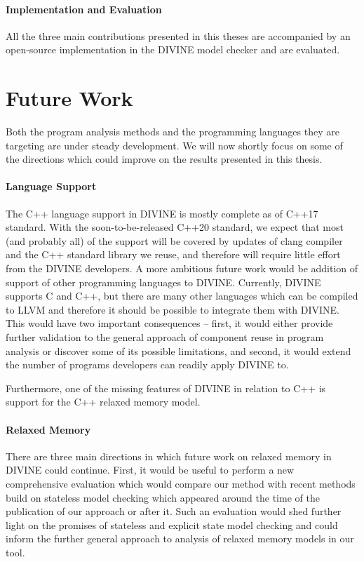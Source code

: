 \paragraph{Implementation and Evaluation}

All the three main contributions presented in this theses are accompanied by an open-source implementation in the DIVINE model checker and are evaluated.

\section{Future Work}

Both the program analysis methods and the programming languages they are targeting are under steady development.
We will now shortly focus on some of the directions which could improve on the results presented in this thesis.

\paragraph{Language Support}

The C++ language support in DIVINE is mostly complete as of C++17 standard.
With the soon-to-be-released C++20 standard, we expect that most (and probably all) of the support will be covered by updates of clang compiler and the C++ standard library we reuse, and therefore will require little effort from the DIVINE developers.
A more ambitious future work would be addition of support of other programming languages to DIVINE.
Currently, DIVINE supports C and C++, but there are many other languages which can be compiled to LLVM and therefore it should be possible to integrate them with DIVINE.
This would have two important consequences -- first, it would either provide further validation to the general approach of component reuse in program analysis or discover some of its possible limitations, and second, it would extend the number of programs developers can readily apply DIVINE to.

Furthermore, one of the missing features of DIVINE in relation to C++ is support for the C++ relaxed memory model.

\paragraph{Relaxed Memory}

There are three main directions in which future work on relaxed memory in DIVINE could continue.
First, it would be useful to perform a new comprehensive evaluation which would compare our method with recent methods build on stateless model checking which appeared around the time of the publication of our approach or after it.
Such an evaluation would shed further light on the promises of stateless and explicit state model checking and could inform the further general approach to analysis of relaxed memory models in our tool.

